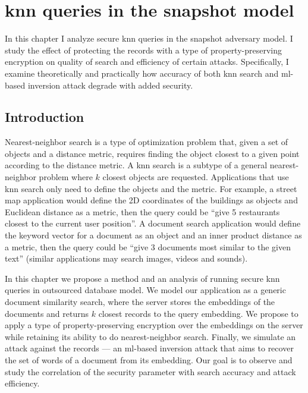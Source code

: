 \chapter{\texorpdfstring{\acrshort{knn}}{kNN} queries in the snapshot model}\label{section:knn-snapshot}
\thispagestyle{myheadings}

	In this chapter I analyze secure \acrshort{knn} queries in the snapshot adversary model.
	I study the effect of protecting the records with a type of property-preserving encryption on quality of search and efficiency of certain attacks.
	Specifically, I examine theoretically and practically how accuracy of both \acrshort{knn} search and \acrshort{ml}-based inversion attack degrade with added security.

	\section{Introduction}

		Nearest-neighbor search is a type of optimization problem that, given a set of objects and a distance metric, requires finding the object closest to a given point according to the distance metric.
		A \acrfull{knn} search is a subtype of a general nearest-neighbor problem where $k$ closest objects are requested.
		Applications that use \acrshort{knn} search only need to define the objects and the metric.
		For example, a street map application would define the 2D coordinates of the buildings as objects and Euclidean distance as a metric, then the query could be ``give 5 restaurants closest to the current user position''.
		A document search application would define the keyword vector for a document as an object and an inner product distance as a metric, then the query could be ``give 3 documents most similar to the given text'' (similar applications may search images, videos and sounds).

		In this chapter we propose a method and an analysis of running secure \acrshort{knn} queries in outsourced database model.
		We model our application as a generic document similarity search, where the server stores the embeddings of the documents and returns $k$ closest records to the query embedding.
		We propose to apply a type of property-preserving encryption over the embeddings on the server while retaining its ability to do nearest-neighbor search.
		Finally, we simulate an attack against the records --- an \acrshort{ml}-based inversion attack that aims to recover the set of words of a document from its embedding.
		Our goal is to observe and study the correlation of the security parameter with search accuracy and attack efficiency.

